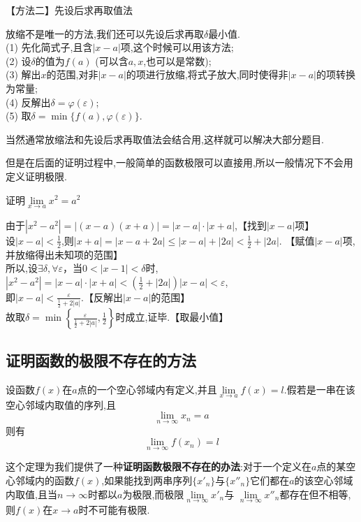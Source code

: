\noindent 【方法二】先设后求再取值法\vspace{0.8em}
\par 放缩不是唯一的方法,我们还可以先设后求再取$\delta $最小值.\\[0.3em]
\noindent (1) 先化简式子,且含$|x-a|$项,这个时候可以用该方法;\\[0.5em]
\noindent (2) 设$\delta $的值为$f(a)$ (可以含$a,x$,也可以是常数);\\[0.5em]
\noindent (3) 解出$x$的范围,对非$|x - a|$的项进行放缩,将式子放大,同时使得非$|x - a|$的项转换为常量;\\[0.5em]
\noindent (4) 反解出$\delta = \varphi (\varepsilon)$;\\[0.5em]
\noindent (5) 取$\delta = \min \lbrace f(a),\varphi(\varepsilon)\rbrace$.\vspace{0.5em}
\par 当然通常放缩法和先设后求再取值法会结合用,这样就可以解决大部分题目.
\par 但是在后面的证明过程中,一般简单的函数极限可以直接用,所以一般情况下不会用定义证明极限.

\examples 证明$\lim\limits_{x \to a}x^2=a^2$

\proof 由于$|x^2-a^2|=|(x-a)(x+a)|=|x-a|\cdot |x+a| $,\hspace{16em}【找到$|x-a|$项】\\[0.5em]
设$\displaystyle |x-a|<\frac{1}{2}$,则$\displaystyle |x+a|=|x-a+2a|\le |x-a|+|2a|<\frac{1}{2}+|2a|.$ \hspace*{2em}【赋值$|x-a|$项,并放缩得出未知项的范围】\\[0.5em]
所以,设$\exists \delta,\forall \varepsilon$，当$0<|x-1|<\delta $时,$\displaystyle |x^2-a^2|=|x-a|\cdot |x+a|<\left( \frac{1}{2}+|2a|\right)|x-a|<\varepsilon $,\\[0.5em]
即$\displaystyle|x-a|<\frac{\varepsilon}{\frac{1}{2}+2|a|}$.\hspace{29em}【反解出$|x-a|$的范围】\\[0.5em]
故取$\displaystyle \delta = \min \left\lbrace  \frac{\varepsilon}{\frac{1}{2}+2|a|},\frac{1}{2} \right\rbrace $时成立,证毕.\hspace{26em}【取最小值】

\subsection{证明函数的极限不存在的方法}
\ttheorem[序列极限]
设函数$f (x)$在$a$点的一个空心邻域内有定义,并且$\lim\limits_{x \to a}f(x)=l$.假若是一串在该空心邻域内取值的序列,且
\begin{equation*}
	\lim\limits_{n \to \infty}x_n=a
\end{equation*}
则有
\begin{equation}
	\lim\limits_{n \to \infty}f(x_n)=l
\end{equation}
\par 这个定理为我们提供了一种\textbf{证明函数极限不存在的办法}:对于一个定义在$a$点的某空心邻域内的函数$f(x)$,如果能找到两串序列$\lbrace x'_n \rbrace $与$\lbrace x''_n\rbrace$它们都在$a$的该空心邻域内取值,且当$n\to \infty $时都以$a$为极限,而极限$\lim\limits_{n \to \infty }x'_n$与 $\lim\limits_{n \to \infty }x''_n$都存在但不相等,则$f(x)$在$x \to a$时不可能有极限.\jg

